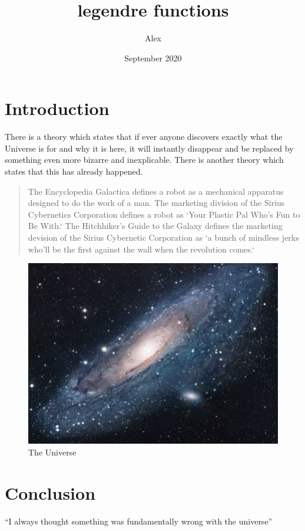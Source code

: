 \documentclass{article}
\title{legendre functions}
\author{Alex}
\date{September 2020}
\begin{document}
\maketitle

\section{Introduction}
There is a theory which states that if ever anyone discovers exactly what the Universe is for and why it is here, it will instantly disappear and be replaced by something even more bizarre and inexplicable.
There is another theory which states that this has already happened.

\begin{quote}
The Encyclopedia Galactica defines a robot as a mechanical apparatus designed to do the work of a man. The marketing division of the Sirius Cybernetics Corporation defines a robot as `Your Plastic Pal Who's Fun to Be With.` The Hitchhiker's Guide to the Galaxy defines the marketing devision of the Sirius Cybernetic Corporation as `a bunch of mindless jerks who'll be the first against the wall when the revolution comes.`
\end{quote}

\begin{figure}[h!]
\centering
\includegraphics[scale=1.7]{universe}
\caption{The Universe}
\label{fig:universe}
\end{figure}

\section{Conclusion}
``I always thought something was fundamentally wrong with the universe'' \citep{adams1995hitchhiker}



\end{document}
